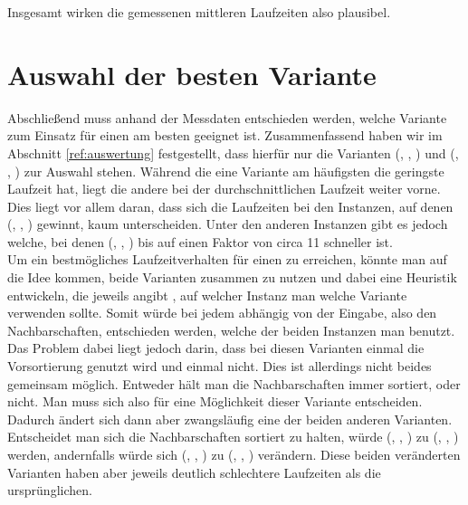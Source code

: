 Insgesamt wirken die gemessenen mittleren Laufzeiten 
also plausibel.




\section{Auswahl der besten Variante}
\label{sec:entscheidung}
Abschließend muss anhand der Messdaten entschieden werden, welche Variante zum Einsatz für
einen \ct{} am besten geeignet ist.
Zusammenfassend haben wir im Abschnitt \ref{ref:auswertung} festgestellt, 
dass hierfür nur die Varianten (\SorSor, \true, \distr) und (\SeaUSet, \false, \perm) zur Auswahl stehen.
Während die eine Variante am häufigsten die geringste Laufzeit hat, liegt die andere 
bei der durchschnittlichen Laufzeit weiter vorne. Dies liegt vor allem daran, dass sich 
die Laufzeiten bei den Instanzen, auf denen (\SeaUSet, \false, \perm) \glqq gewinnt\grqq{}, kaum unterscheiden.
Unter den anderen Instanzen gibt es jedoch welche, bei denen (\SorSor, \true, \distr) bis auf einen
Faktor von circa 11 schneller ist.
\\

Um ein bestmögliches Laufzeitverhalten für einen \ct{} zu erreichen, könnte man auf die Idee kommen, 
beide Varianten zusammen zu nutzen
und dabei eine Heuristik entwickeln, die jeweils angibt ,
auf welcher Instanz man welche Variante verwenden sollte. Somit würde bei jedem \ct{} abhängig von 
der Eingabe, also den Nachbarschaften, entschieden werden, welche der beiden Instanzen man benutzt. 
Das Problem dabei liegt jedoch darin, dass bei diesen Varianten einmal die Vorsortierung
genutzt wird und einmal nicht. Dies ist allerdings nicht beides gemeinsam möglich. Entweder hält man die
Nachbarschaften immer sortiert, oder nicht. Man muss sich also für eine Möglichkeit dieser
Variante  entscheiden. Dadurch ändert sich dann aber zwangsläufig  eine der beiden anderen Varianten. 
Entscheidet man sich die Nachbarschaften sortiert zu halten, würde (\SeaUSet, \false, \perm) zu (\SeaUSet, \true, \perm){}
werden, andernfalls würde sich (\SorSor, \true, \distr) zu (\SorSor, \false, \distr) verändern.
Diese beiden \glqq veränderten\grqq{} Varianten haben aber jeweils deutlich schlechtere Laufzeiten
als die ursprünglichen.
\\

